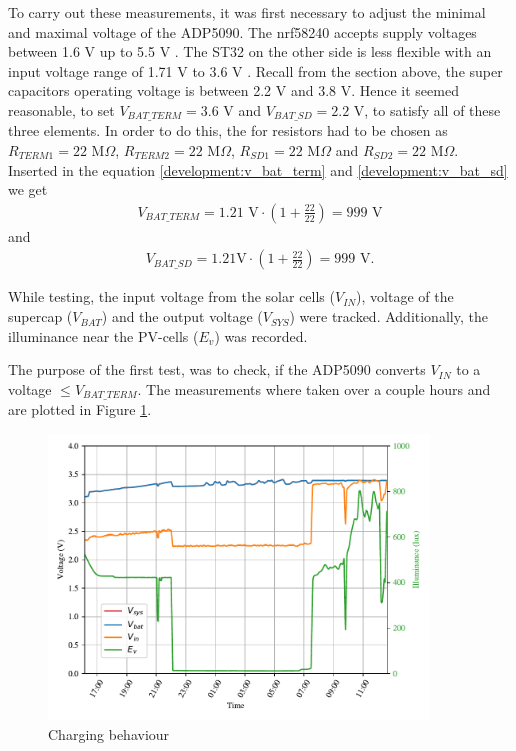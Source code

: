 To carry out these measurements, it was first necessary to adjust the minimal and maximal voltage of the ADP5090.
The nrf58240 accepts supply voltages between 1.6 V up to 5.5 V \cite{nrf}.
The ST32 on the other side is less flexible with an input voltage range of 1.71 V to 3.6 V \cite{stm32}.
Recall from the section above, the super capacitors operating voltage is between 2.2 V and 3.8 V.
Hence it seemed reasonable, to set $V_{BAT\_TERM} = 3.6$ V and $V_{BAT\_SD} = 2.2$ V, to satisfy all of these three elements.
In order to do this, the for resistors had to be chosen as $R_{TERM1} = 22$ M$\Omega$, $R_{TERM2} = 22$ M$\Omega$, $R_{SD1} = 22$ M$\Omega$ and $R_{SD2} = 22$ M$\Omega$.
Inserted in the equation \eqref{development:v_bat_term} and \eqref{development:v_bat_sd} we get
\begin{align*}
	V_{BAT\_TERM}= 1.21\text{ V}\cdot \left(1 + \frac{22}{22} \right) = 999 \text{ V} 
\end{align*}
and
\begin{align*}
	V_{BAT\_SD} = 1.21 \text{V}\cdot \left(1 + \frac{22}{22} \right) = 999 \text{ V}. 
\end{align*}

While testing, the input voltage from the solar cells ($V_{IN}$), voltage of the supercap ($V_{BAT}$) and the output voltage ($V_{SYS}$) were tracked. Additionally, the illuminance near the PV-cells ($E_v$) was recorded.

The purpose of the first test, was to check, if the ADP5090 converts $V_{IN}$ to a voltage $\le V_{BAT\_TERM}$.
The measurements where taken over a couple hours and are plotted in Figure \ref{development:charge}.

\begin{figure}[h]
	\centering
	\includegraphics[width=0.9\textwidth]{5-development/hardware/graphics/laden.pdf}
	\caption{Charging behaviour\label{development:charge}}
\end{figure}

